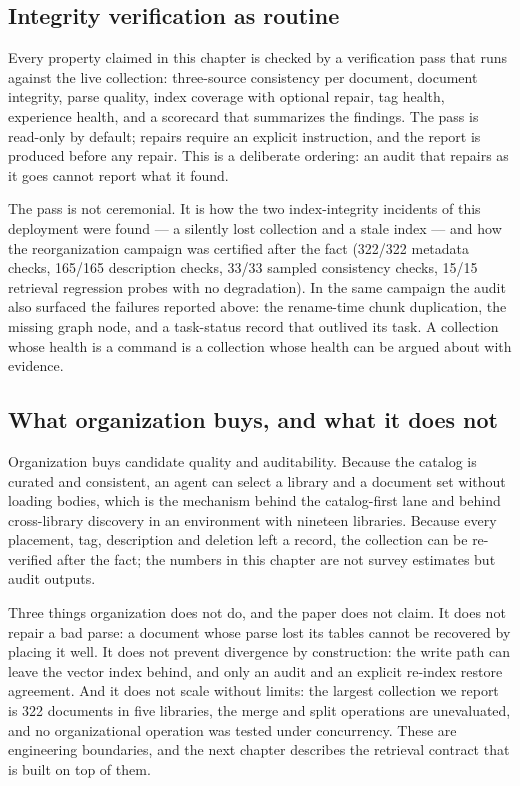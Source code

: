 \subsection{Integrity verification as routine}
\label{sec:org-integrity}

Every property claimed in this chapter is checked by a verification pass that
runs against the live collection: three-source consistency per document,
document integrity, parse quality, index coverage with optional repair, tag
health, experience health, and a scorecard that summarizes the findings. The
pass is read-only by default; repairs require an explicit instruction, and
the report is produced before any repair. This is a deliberate ordering: an
audit that repairs as it goes cannot report what it found.

The pass is not ceremonial. It is how the two index-integrity incidents of
this deployment were found --- a silently lost collection and a stale index
--- and how the reorganization campaign was certified after the fact
(322/322 metadata checks, 165/165 description checks, 33/33 sampled
consistency checks, 15/15 retrieval regression probes with no degradation).
In the same campaign the audit also surfaced the failures reported above: the
rename-time chunk duplication, the missing graph node, and a task-status
record that outlived its task. A collection whose health is a command is a
collection whose health can be argued about with evidence.

\subsection{What organization buys, and what it does not}
\label{sec:org-summary}

Organization buys candidate quality and auditability. Because the catalog is
curated and consistent, an agent can select a library and a document set
without loading bodies, which is the mechanism behind the catalog-first lane
and behind cross-library discovery in an environment with nineteen libraries.
Because every placement, tag, description and deletion left a record, the
collection can be re-verified after the fact; the numbers in this chapter are
not survey estimates but audit outputs.

Three things organization does not do, and the paper does not claim. It does
not repair a bad parse: a document whose parse lost its tables cannot be
recovered by placing it well. It does not prevent divergence by
construction: the write path can leave the vector index behind, and only an
audit and an explicit re-index restore agreement. And it does not scale
without limits: the largest collection we report is 322 documents in five
libraries, the merge and split operations are unevaluated, and no
organizational operation was tested under concurrency. These are engineering
boundaries, and the next chapter describes the retrieval contract that is
built on top of them.
